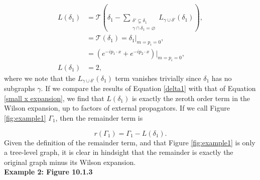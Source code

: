 \documentclass{article}
\begin{document}
\begin{equation}
\begin{split}
    L(\delta_1) &= \mathcal{T}\left( \delta_1 - \sum_{\substack{\delta'\varsubsetneq \delta_1 \\ \gamma\cap\delta_1 = \varnothing }} L_{\gamma\cup\delta'}(\delta_1)  \right),\\
    &= \mathcal{T}(\delta_1) = \delta_1\vert_{m=p_i=0},\\
    &= (e^{-ip_1\cdot x} + e^{-ip_2\cdot x})\vert_{m=p_i=0},\\
    L(\delta_1) &=2,
\end{split}
\label{delta1}
\end{equation}
where we note that the $L_{\gamma\cup\delta'}(\delta_1)$ term vanishes trivially since $\delta_1$ has no subgraphs $\gamma$.  If we compare the results of Equation \ref{delta1} with that of Equation \ref{small x expansion}, we find that $L(\delta_1)$ is exactly the zeroth order term in the Wilson expansion, up to factors of external propagators. If we call Figure \ref{fig:example1} $\Gamma_1$, then the remainder term is 

\begin{equation}
    r(\Gamma_1) = \Gamma_1 - L(\delta_1).
    \label{rGamma1}
\end{equation}
Given the definition of the remainder term, and that Figure \ref{fig:example1} is only a tree-level graph, it is clear in hindsight that the remainder is exactly the original graph minus its Wilson expansion.\\

\noindent\textbf{Example 2: Figure 10.1.3}
\end{document}
